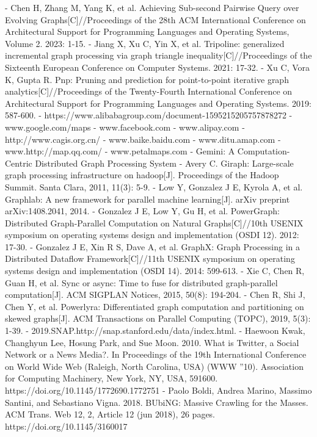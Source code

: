 \documentclass[lettersize,journal]{IEEEtran} %
\begin{document}
- Chen H, Zhang M, Yang K, et al. Achieving Sub-second Pairwise Query over Evolving Graphs[C]//Proceedings of the 28th ACM International Conference on Architectural Support for Programming Languages and Operating Systems, Volume 2. 2023: 1-15.
- Jiang X, Xu C, Yin X, et al. Tripoline: generalized incremental graph processing via graph triangle inequality[C]//Proceedings of the Sixteenth European Conference on Computer Systems. 2021: 17-32.
- Xu C, Vora K, Gupta R. Pnp: Pruning and prediction for point-to-point iterative graph analytics[C]//Proceedings of the Twenty-Fourth International Conference on Architectural Support for Programming Languages and Operating Systems. 2019: 587-600.
- https://www.alibabagroup.com/document-1595215205757878272
- www.google.com/maps
- www.facebook.com
- www.alipay.com
- http://www.cagis.org.cn/
- www.baike.baidu.com
- www.ditu.amap.com
- www.http://map.qq.com/
- www.petalmaps.com
- Gemini: A Computation-Centric Distributed Graph Processing System
- Avery C. Giraph: Large-scale graph processing infrastructure on hadoop[J]. Proceedings of the Hadoop Summit. Santa Clara, 2011, 11(3): 5-9.
- Low Y, Gonzalez J E, Kyrola A, et al. Graphlab: A new framework for parallel machine learning[J]. arXiv preprint arXiv:1408.2041, 2014.
- Gonzalez J E, Low Y, Gu H, et al. {PowerGraph}: Distributed {Graph-Parallel} Computation on Natural Graphs[C]//10th USENIX symposium on operating systems design and implementation (OSDI 12). 2012: 17-30.
- Gonzalez J E, Xin R S, Dave A, et al. {GraphX}: Graph Processing in a Distributed Dataflow Framework[C]//11th USENIX symposium on operating systems design and implementation (OSDI 14). 2014: 599-613.
- Xie C, Chen R, Guan H, et al. Sync or async: Time to fuse for distributed graph-parallel computation[J]. ACM SIGPLAN Notices, 2015, 50(8): 194-204.
- Chen R, Shi J, Chen Y, et al. Powerlyra: Differentiated graph computation and partitioning on skewed graphs[J]. ACM Transactions on Parallel Computing (TOPC), 2019, 5(3): 1-39.
- 2019.SNAP.http://snap.stanford.edu/data/index.html.
- Haewoon Kwak, Changhyun Lee, Hosung Park, and Sue Moon. 2010. What is Twitter, a Social Network or a News Media?. In Proceedings of the 19th International Conference on World Wide Web (Raleigh, North Carolina, USA) (WWW ''10). Association for Computing Machinery, New York, NY, USA, 591600. https://doi.org/10.1145/1772690.1772751
- Paolo Boldi, Andrea Marino, Massimo Santini, and Sebastiano Vigna. 2018. BUbiNG: Massive Crawling for the Masses. ACM Trans. Web 12, 2, Article 12 (jun 2018), 26 pages. https://doi.org/10.1145/3160017
\end{document}

